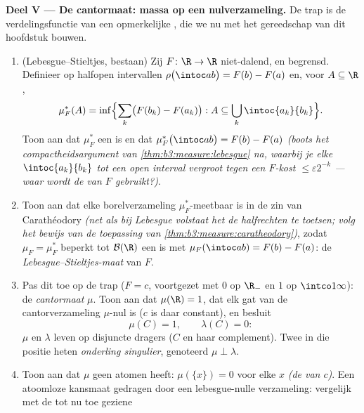 \begin{problem}
\medskip
\noindent\textbf{Deel V --- De cantormaat: massa op een
nulverzameling.} De trap is de verdelingsfunctie van een
opmerkelijke , die we nu met het gereedschap van dit hoofdstuk
bouwen.
\begin{enumerate}[resume]
  \item (Lebesgue--Stieltjes, bestaan) Zij $F\colon\R\to\R$
        niet-dalend,  en begrensd. Definieer op halfopen
        intervallen $\rho\bigl(\intoc ab\bigr) = F(b) - F(a)$ en,
        voor $A \subseteq \R$,
        \[
        \mu_F^*(A) = \inf\Bigl\{\sum_k\bigl(F(b_k) -
        F(a_k)\bigr) : A \subseteq
        \bigcup_k\intoc{a_k}{b_k}\Bigr\} .
        \]
        Toon aan dat $\mu_F^*$ een  is en dat
        $\mu_F^*\bigl(\intoc ab\bigr) = F(b) - F(a)$ \emph{(boots
        het compactheidsargument van
        \cref{thm:b3:measure:lebesgue} na, waarbij je elke
        $\intoc{a_k}{b_k}$ tot een open interval vergroot tegen
        een $F$-kost $\leq \varepsilon2^{-k}$ --- waar wordt de
         van $F$ gebruikt?)}.
  \item Toon aan dat elke borelverzameling $\mu_F^*$-meetbaar is
        in de zin van Carathéodory \emph{(net als bij Lebesgue
        volstaat het de halfrechten te toetsen; volg het bewijs
        van de toepassing van
        \cref{thm:b3:measure:caratheodory})}, zodat $\mu_F =
        \mu_F^*$ beperkt tot $\mathcal B(\R)$ een  is met
        $\mu_F(\intoc ab) = F(b) - F(a)$: de
        \emph{Lebesgue--Stieltjes-maat} van $F$.
  \item Pas dit toe op de trap ($F = c$, voortgezet met $0$ op
        $\R_-$ en $1$ op $\intco1\infty$): de \emph{cantormaat}
        $\mu$. Toon aan dat $\mu(\R) = 1$, dat elk gat van de
        cantorverzameling $\mu$-nul is ($c$ is daar constant), en
        besluit
        \[
        \mu(C) = 1, \qquad \lambda(C) = 0 :
        \]
        $\mu$ en $\lambda$ leven op disjuncte dragers ($C$ en haar
        complement). Twee  in die positie heten
        \emph{onderling singulier}, genoteerd $\mu \perp
        \lambda$.
  \item Toon aan dat $\mu$ geen atomen heeft: $\mu(\{x\}) = 0$
        voor elke $x$ \emph{(de  van $c$)}. Een
        atoomloze kansmaat gedragen door een lebesgue-nulle
         verzameling: vergelijk met de tot nu toe geziene

\end{enumerate}
\end{problem}
